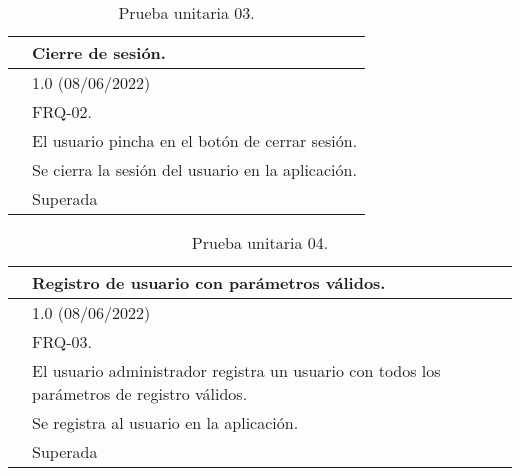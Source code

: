 \begin{table}[H]
\begin{center}
\begin{tabular}{|p{3cm}|p{10cm}|} \hline
\centering {\bf PU-03} & Cierre de sesión.  \\ \hline\hline
\centering {\bf Versión} & 1.0 (08/06/2022) \\ \hline
\centering {\bf Dependencias} & FRQ-02. \\ \hline
\centering {\bf Descripción} &  El usuario pincha en el botón de cerrar sesión. \\ \hline
\centering {\bf Criterio de aceptación} & Se cierra la sesión del usuario en la aplicación. \\ \hline
\centering {\bf Estado} & Superada \\ \hline
\end{tabular}
\caption{Prueba unitaria 03.}
\label{enlacePU3}
\end{center}
\end{table}

\begin{table}[H]
\begin{center}
\begin{tabular}{|p{3cm}|p{10cm}|} \hline
\centering {\bf PU-04} & Registro de usuario con parámetros válidos.  \\ \hline\hline
\centering {\bf Versión} & 1.0 (08/06/2022) \\ \hline
\centering {\bf Dependencias} & FRQ-03. \\ \hline
\centering {\bf Descripción} &  El usuario administrador registra un usuario con todos los parámetros de registro válidos. \\ \hline
\centering {\bf Criterio de aceptación} & Se registra al usuario en la aplicación. \\ \hline
\centering {\bf Estado} & Superada \\ \hline
\end{tabular}
\caption{Prueba unitaria 04.}
\label{enlacePU4}
\end{center}
\end{table}

